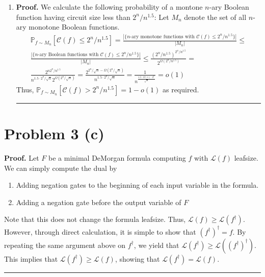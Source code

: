 \documentclass[12pt]{article}%
\DeclarePairedDelimiter\floor{\lfloor}{\rfloor}
\newenvironment{proof}[1][Proof]{\textbf{#1.} }{\ \rule{0.5em}{0.5em}}
\begin{document}
\begin{enumerate}
\begin{proof}
    This gives us $n$ distinct $2^{n-1 \choose \floor{\frac{n-1}{2}}}$ sets of monotone $n$-ary Boolean functions. Now notice that
    $$ \frac{n}{(n/2)^2}{n-1 \choose \floor{\frac{n-1}{2}}} \geq {n \choose \floor{\frac{n}{2}}}$$
    So, $16n2^{{n-1 \choose \floor{\frac{n-1}{2}}}} = 2^{4\log n {n-1 \choose \floor{\frac{n-1}{2}}}} \geq 2^{\frac{4}{n} {n-1 \choose \floor{\frac{n-1}{2}}}} \geq 2^{{n \choose \floor{\frac{n}{2}}}}$, giving us the desired result.
    \end{proof}
    \item
    \begin{proof}
      We calculate the following probability of a montone $n$-ary Boolean function having circuit size less than $2^n/n^{1.5}$: Let $M_n$ denote the set of all $n$-ary monotone Boolean functions.
      \begin{gather*}
        \mathbb{P}_{f \sim M_n} [ \mathcal{C}(f) \leq 2^n/n^{1.5}] = \frac{|\{\text{$n$-ary monotone functions with $\mathcal{C}(f) \leq 2^n/n^{1.5}$}\}|}{|M_n|} \leq \\
        \frac{|\{\text{$n$-ary Boolean functions with $\mathcal{C}(f) \leq 2^n/n^{1.5}$}\}|}{|M_n|} \leq \frac{(2^n/n^{1.5})^{2^n/n^{1.5}}}{2^{\Omega(2^n/n^{1.5})}} = \\
        \frac{2^{n2^n/n^{1.5}}}
        {n^{1.5 \cdot 2^n / \sqrt{n}}2^{\Omega(2^n/\sqrt{n})}} =
        \frac{ 2^{ 2^n/\sqrt{n} - \Omega(2^n/\sqrt{n})} }
             {n^{1.5 \cdot 2^n/\sqrt{n}}} = \frac{1}{{n^{\frac{1.5 \cdot \Omega(1)\cdot2^n}{\sqrt{n}} }} } = o(1)
      \end{gather*}
      Thus,
      $\mathbb{P}_{f \sim M_n} [ \mathcal{C}(f) > 2^n/n^{1.5}] = 1 - o(1) $ as required.
    \end{proof}
\end{enumerate}

\section{Problem 3 (c)}
\begin{proof}
  Let $F$ be a minimal DeMorgan formula computing $f$ with $\mathcal{L}(f)$ leafsize. We can simply compute the dual by
  \begin{enumerate}
     \item Adding negation gates to the beginning of each input variable in the formula.
     \item Adding a negation gate before the output variable of $F$
  \end{enumerate}
  Note that this does not change the formula leafsize. Thus, $\mathcal{L}(f) \geq \mathcal{L}(f^{\dagger})$. However, through direct calculation, it is simple to show that $(f^{\dagger})^{\dagger} = f$. By repeating the same argument above on $f^{\dagger}$, we yield that $\mathcal{L}(f^{\dagger}) \geq \mathcal{L}((f^{\dagger})^{\dagger})$. This implies that $\mathcal{L}(f^{\dagger}) \geq \mathcal{L}(f)$, showing that $\mathcal{L}(f^{\dagger}) = \mathcal{L}(f)$.
\end{proof}
\end{document}
